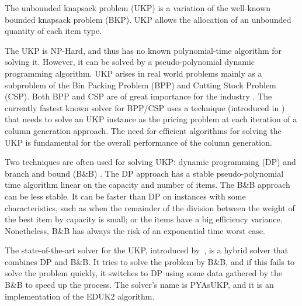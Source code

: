 \documentclass[runningheads,a4paper]{llncs}
\begin{document}
The unbounded knapsack problem (UKP) is a variation of the well-known bounded knapsack problem (BKP).
UKP allows the allocation of an unbounded quantity of each item type.

The UKP is NP-Hard, and thus has no known polynomial-time algorithm for solving it. 
However, it can be solved by a pseudo-polynomial dynamic programming algorithm.
UKP arises in real world problems mainly as a subproblem of the Bin Packing Problem (BPP) and Cutting Stock Problem (CSP). 
Both BPP and CSP are of great importance for the industry \cite{survey2014}\cite{gg-1}\cite{gg-2}. 
The currently fastest known solver for BPP/CSP\cite{survey2014}\cite{belov} 
uses a technique (introduced in \cite{gg-1}) that needs to solve an UKP instance as the pricing problem at each iteration of a column generation approach. 
The need for efficient algorithms for solving the UKP is fundamental for the overall performance of the column generation.

Two techniques are often used for solving UKP: dynamic programming (DP) \cite[p. 214]{gar72}\cite{eduk}\cite[p. 311]{tchu} and branch and bound (B\&B) \cite{mtu2}. 
The DP approach has a stable pseudo-polynomial time algorithm linear on the capacity and number of items. 
The B\&B approach can be less stable. 
It can be faster than DP on instances with some characteristics, such as when the remainder of the division between the weight of the best item by capacity is small; or the items have a big efficiency variance. Nonetheless, B\&B has always the risk of an exponential time worst case.

The state-of-the-art solver for the UKP, introduced by~\cite{pya}, is a hybrid solver that combines DP and B\&B. 
It tries to solve the problem by B\&B, and if this fails to solve the problem quickly, it switches to DP using some data gathered by the B\&B to speed up the process. 
The solver's name is PYAsUKP, and it is an implementation of the EDUK2 algorithm.%

\end{document}
